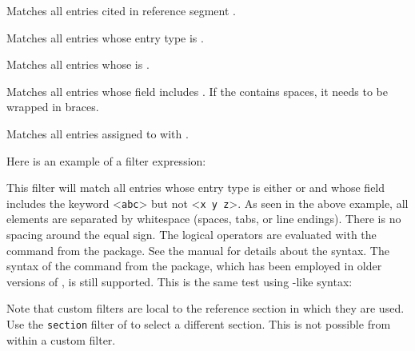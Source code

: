 \documentclass{ltxdockit}[2011/03/25]
\newcommand*{\biblatex}{\sty{biblatex}\xspace}
\begin{document}
\begin{optionlist*}


Matches all entries cited in reference segment .


Matches all entries whose entry type is .


Matches all entries whose  is .


Matches all entries whose  field includes . If the  contains spaces, it needs to be wrapped in braces.


Matches all entries assigned to  with .

\end{optionlist*}

Here is an example of a filter expression:

\begin{ltxexample}[style=latex,keywords={and,or,not,type,keyword}]{}
\end{ltxexample}
%
This filter will match all entries whose entry type is either  or  and whose  field includes the keyword <\texttt{abc}> but not <\texttt{x y z}>. As seen in the above example, all elements are separated by whitespace (spaces, tabs, or line endings). There is no spacing around the equal sign. The logical operators are evaluated with the  command from the  package. See the  manual for details about the syntax. The syntax of the  command from the  package, which has been employed in older versions of \biblatex, is still supported. This is the same test using -like syntax:

\begin{ltxexample}[style=ifthen,morekeywords={\\type,\\keyword}]{}
\end{ltxexample}
%
Note that custom filters are local to the reference section in which they are used. Use the \texttt{section} filter of  to select a different section. This is not possible from within a custom filter.
\end{document}
